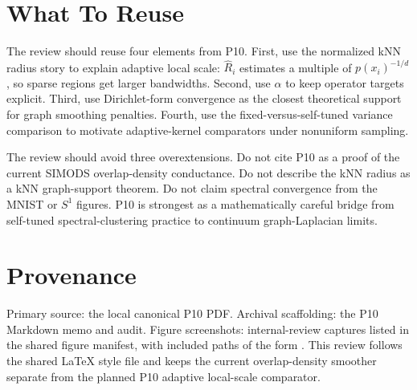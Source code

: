 \documentclass[11pt]{article}
\begin{document}
\section{What To Reuse}

The review should reuse four elements from P10. First, use the normalized kNN
radius story to explain adaptive local scale: \(\widehat R_i\) estimates a
multiple of \(p(x_i)^{-1/d}\), so sparse regions get larger bandwidths.
Second, use \(\alpha\) to keep operator targets explicit. Third, use
Dirichlet-form convergence as the closest theoretical support for graph
smoothing penalties. Fourth, use the fixed-versus-self-tuned variance
comparison to motivate adaptive-kernel comparators under nonuniform sampling.

The review should avoid three overextensions. Do not cite P10 as a proof of
the current SIMODS overlap-density conductance. Do not describe the kNN radius
as a kNN graph-support theorem. Do not claim spectral convergence from the
MNIST or \(S^1\) figures. P10 is strongest as a mathematically careful bridge
from self-tuned spectral-clustering practice to continuum graph-Laplacian
limits.

\section*{Provenance}

Primary source: the local canonical P10 PDF. Archival scaffolding: the P10
Markdown memo and audit. Figure screenshots: internal-review captures listed
in the shared figure manifest, with included paths of the form
. This review follows the shared LaTeX style
file and keeps the current  overlap-density
smoother separate from the planned P10 adaptive local-scale comparator.



\end{document}
